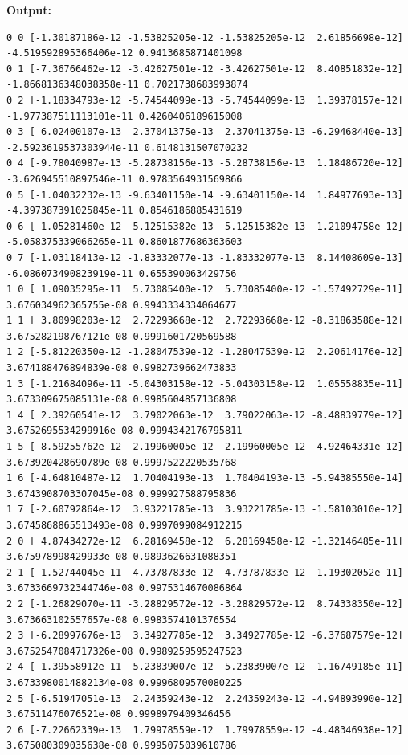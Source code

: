 \documentclass{article}
\begin{document}
\textbf{Output:}\begin{verbatim}
0 0 [-1.30187186e-12 -1.53825205e-12 -1.53825205e-12  2.61856698e-12] -4.519592895366406e-12 0.9413685871401098
0 1 [-7.36766462e-12 -3.42627501e-12 -3.42627501e-12  8.40851832e-12] -1.8668136348038358e-11 0.7021738683993874
0 2 [-1.18334793e-12 -5.74544099e-13 -5.74544099e-13  1.39378157e-12] -1.977387511113101e-11 0.4260406189615008
0 3 [ 6.02400107e-13  2.37041375e-13  2.37041375e-13 -6.29468440e-13] -2.5923619537303944e-11 0.6148131507070232
0 4 [-9.78040987e-13 -5.28738156e-13 -5.28738156e-13  1.18486720e-12] -3.626945510897546e-11 0.9783564931569866
0 5 [-1.04032232e-13 -9.63401150e-14 -9.63401150e-14  1.84977693e-13] -4.397387391025845e-11 0.8546186885431619
0 6 [ 1.05281460e-12  5.12515382e-13  5.12515382e-13 -1.21094758e-12] -5.058375339066265e-11 0.8601877686363603
0 7 [-1.03118413e-12 -1.83332077e-13 -1.83332077e-13  8.14408609e-13] -6.086073490823919e-11 0.655390063429756
1 0 [ 1.09035295e-11  5.73085400e-12  5.73085400e-12 -1.57492729e-11] 3.676034962365755e-08 0.9943334334064677
1 1 [ 3.80998203e-12  2.72293668e-12  2.72293668e-12 -8.31863588e-12] 3.675282198767121e-08 0.9991601720569588
1 2 [-5.81220350e-12 -1.28047539e-12 -1.28047539e-12  2.20614176e-12] 3.674188476894839e-08 0.9982739662473833
1 3 [-1.21684096e-11 -5.04303158e-12 -5.04303158e-12  1.05558835e-11] 3.673309675085131e-08 0.9985604857136808
1 4 [ 2.39260541e-12  3.79022063e-12  3.79022063e-12 -8.48839779e-12] 3.6752695534299916e-08 0.9994342176795811
1 5 [-8.59255762e-12 -2.19960005e-12 -2.19960005e-12  4.92464331e-12] 3.673920428690789e-08 0.9997522220535768
1 6 [-4.64810487e-12  1.70404193e-13  1.70404193e-13 -5.94385550e-14] 3.6743908703307045e-08 0.999927588795836
1 7 [-2.60792864e-12  3.93221785e-13  3.93221785e-13 -1.58103010e-12] 3.6745868865513493e-08 0.9997099084912215
2 0 [ 4.87434272e-12  6.28169458e-12  6.28169458e-12 -1.32146485e-11] 3.675978998429933e-08 0.9893626631088351
2 1 [-1.52744045e-11 -4.73787833e-12 -4.73787833e-12  1.19302052e-11] 3.6733669732344746e-08 0.9975314670086864
2 2 [-1.26829070e-11 -3.28829572e-12 -3.28829572e-12  8.74338350e-12] 3.673663102557657e-08 0.9983574101376554
2 3 [-6.28997676e-13  3.34927785e-12  3.34927785e-12 -6.37687579e-12] 3.6752547084717326e-08 0.9989259595247523
2 4 [-1.39558912e-11 -5.23839007e-12 -5.23839007e-12  1.16749185e-11] 3.6733980014882134e-08 0.9996809570080225
2 5 [-6.51947051e-13  2.24359243e-12  2.24359243e-12 -4.94893990e-12] 3.67511476076521e-08 0.9998979409346456
2 6 [-7.22662339e-13  1.79978559e-12  1.79978559e-12 -4.48346938e-12] 3.675080309035638e-08 0.9995075039610786

\end{verbatim}
\end{document}

